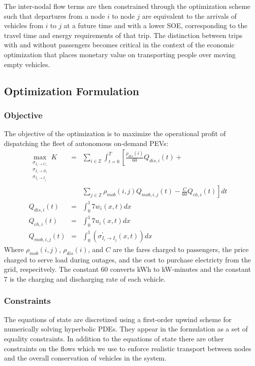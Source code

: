 \documentclass[journal]{IEEEtran}
\begin{document}
The inter-nodal flow terms are then constrained through the optimization scheme such that departures from a node $i$ to node $j$ are equivalent to the arrivals of vehicles from $i$ to $j$ at a future time and with a lower SOE, corresponding to the travel time and energy requirements of that trip. The distinction between trips with and without passengers becomes critical in the context of the economic optimization that places monetary value on transporting people over moving empty vehicles.

\subsection{Optimization Formulation}

\subsubsection{Objective}
The objective of the optimization is to maximize the operational profit of dispatching the fleet of autonomous on-demand PEVs:
\begin{eqnarray*}
  \max_{\substack{\sigma_{I_i \rightarrow C_i} \\
    \sigma_{I_i \rightarrow D_i} \\ 
    \sigma_{I_i \rightarrow I_j}}}
    K &=& \sum_{i\in\mathbb{Z}} \int_{t=0}^{T} \left[ \frac{\rho_{dis}(i)}{60} Q_{dis,i}(t) + \right. \\ 
      && \left. \sum_{j\in\mathbb{Z}}\rho_{mob}(i,j)Q_{mob,i,j}(t)  - \frac{C}{60}Q_{ch,i}(t) \right]dt\\
    Q_{dis,i}(t) & = & \int_{0}^{1} 7 w_i(x,t) dx \\
    Q_{ch,i}(t) & = & \int_{0}^{1} 7 u_i(x,t) dx \\
    Q_{mob,i,j}(t) & = & \int_{0}^{1}\left( \sigma_{I_i \rightarrow I_j}^\prime(x,t) \right)dx
\end{eqnarray*}
Where $\rho_{mob}(i,j)$, $\rho_{dis}(i)$, and $C$ are the fares charged to passengers, the price charged to serve load during outages, and the cost to purchase electricty from the grid, respecitvely. The constant 60 converts kWh to kW-minutes and the constant 7 is the charging and discharging rate of each vehicle.

\subsubsection{Constraints}

The equations of state are discretized using a first-order upwind scheme for numerically solving hyperbolic PDEs. They appear in the formulation as a set of equality constraints. In addition to the equations of state there are other constraints on the flows which we use to enforce realistic transport between nodes and the overall conservation of vehicles in the system. 
\end{document}
